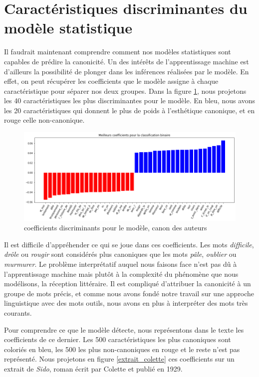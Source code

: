 \section{Caractéristiques discriminantes du modèle statistique}

Il faudrait maintenant comprendre comment nos modèles statistiques sont capables de prédire la canonicité. Un des intérêts de l'apprentissage machine est d'ailleurs la possibilité de plonger dans les inférences réalisées par le modèle. En effet, on peut récupérer les coefficients que le modèle assigne à chaque caractéristique pour séparer nos deux groupes. Dans la figure \ref{coefs}, nous projetons les 40 caractéristiques les plus discriminantes pour le modèle. En bleu, nous avons les 20 caractéristiques qui donnent le plus de poids à l'esthétique canonique, et en rouge celle non-canonique. 



\bigskip
\begin{figure}[!ht]
    \centering
    \includegraphics[width=17cm]{img/12_coef_fabula.png}
    \caption{coefficients discriminants pour le modèle, canon des auteurs}
    \label{coefs}
\end{figure}


Il est difficile d'appréhender ce qui se joue dans ces coefficients. Les mots \textit{difficile}, \textit{drôle} ou \textit{rougir} sont considérés plus canoniques que les mots \textit{pâle}, \textit{oublier} ou \textit{murmurer}. Le problème interprétatif auquel nous faisons face n'est pas dû à l'apprentissage machine mais plutôt à la complexité du phénomène que nous modélisons, la réception littéraire. Il est compliqué d'attribuer la canonicité à un groupe de mots précis, et comme nous avons fondé notre travail sur une approche linguistique avec des mots outils, nous avons en plus à interpréter des mots très courants. 

Pour comprendre ce que le modèle détecte, nous représentons dans le texte les coefficients de ce dernier. Les 500 caractéristiques les plus canoniques sont coloriés en bleu, les 500 les plus non-canoniques en rouge et le reste n'est pas représenté. Nous projetons en figure \ref{extrait_colette} ces coefficients sur un extrait de \textit{Sido}, roman écrit par Colette et publié en 1929.

